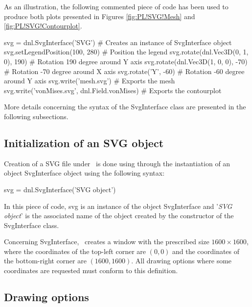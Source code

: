 As an illustration, the following commented piece of code has been used to produce both plots presented in Figures \ref{fig:PL!SVG!Mesh} and \ref{fig:PL!SVG!Contourplot}.
\begin{PythonListing}
svg = dnl.SvgInterface('SVG')       # Creates an instance of SvgInterface object
svg.setLegendPosition(100, 280)     # Position the legend
svg.rotate(dnl.Vec3D(0, 1, 0), 190) # Rotation 190 degree around Y axis
svg.rotate(dnl.Vec3D(1, 0, 0), -70) # Rotation -70 degree around X axis
svg.rotate('Y', -60)                # Rotation -60 degree around Y axis
svg.write('mesh.svg')               # Exports the mesh
svg.write('vonMises.svg', dnl.Field.vonMises) # Exports the contourplot
\end{PythonListing}

More details concerning the syntax of the SvgInterface class are presented in the following subsections.

\subsection{Initialization of an SVG object}
Creation of a SVG file under \DynELA~is done using through the instantiation of an object \textsf{SvgInterface} object using the following syntax:
\begin{PythonListing}
svg = dnl.SvgInterface('SVG object')
\end{PythonListing}
In this piece of code, \textsf{svg} is an instance of the object \textsf{SvgInterface} and '\emph{SVG object}' is the associated name of the object created by the constructor of the \textsf{SvgInterface} class.

Concerning \textsf{SvgInterface}, \DynELA~creates a window with the prescribed size $1600\times1600$, where the coordinates of the top-left corner are $(0, 0)$ and the coordinates of the bottom-right corner are $(1600, 1600)$. All drawing options where some coordinates are requested must conform to this definition.

\subsection{Drawing options}

